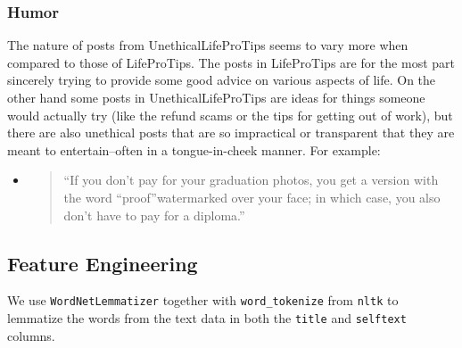 \documentclass{amsart}
\theoremstyle{definition}
\theoremstyle{remark}
\newcommand{\tql}{\textquotedblleft}
\newcommand{\tqr}{\textquotedblright}
\begin{document}
\subsubsection{Humor} The nature of posts from UnethicalLifeProTips seems to vary more when compared to those of LifeProTips.  The posts in LifeProTips are for the most part sincerely trying to provide some good advice on various aspects of life.  On the other hand some posts in UnethicalLifeProTips are ideas for things someone would actually try (like the refund scams or the tips for getting out of work), but there are also unethical posts that are so impractical or transparent that they are meant to entertain--often in a tongue-in-cheek manner.  For example:

\begin{itemize}

\item \begin{quote}
\tql If you don't pay for your graduation photos, you get a version with the word \tql proof\tqr watermarked over your face; in which case, you also don't have to pay for a diploma.\tqr
\end{quote}
%

\end{itemize}
















\subsection{Feature Engineering}

We use \texttt{WordNetLemmatizer} together with \texttt{word\_tokenize} from \texttt{nltk} to lemmatize the words from the text data in both the \texttt{title} and \texttt{selftext} columns.
\end{document}
